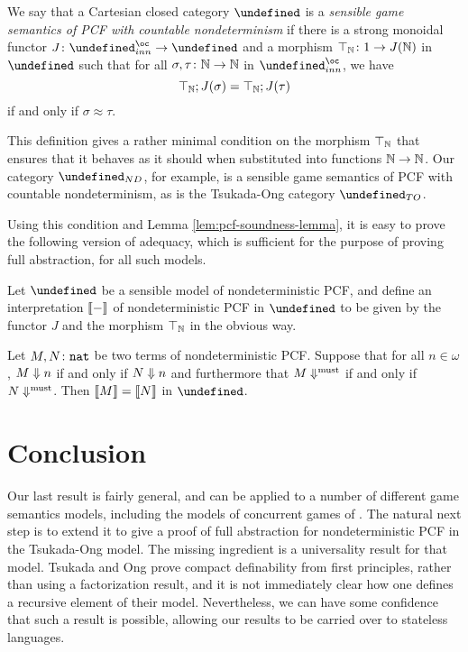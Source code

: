 \documentclass[sigplan,9pt,review]{acmart}\settopmatter{printfolios=true,printccs=false,printacmref=false}
\let\G\undefined
\let\C\undefined
\begin{document}
\begin{definition}
  We say that a Cartesian closed category $\C$ is a \emph{sensible game semantics of PCF with countable nondeterminism} if there is a strong monoidal functor $J\from\G_{inn}^\oc\to\C$ and a morphism $\top_{\mathbb{N}}\colon 1 \to J(\mathbb{N})$ in $\C$ such that for all $\sigma,\tau\colon\mathbb{N}\to\mathbb{N}$ in $\G_{inn}^\oc$, we have
  \[
    \top_{\mathbb{N}};J(\sigma)=\top_{\mathbb{N}};J(\tau)
    \]
  if and only if $\sigma\approx\tau$.  
\end{definition}

This definition gives a rather minimal condition on the morphism $\top_{\mathbb{N}}$ that ensures that it behaves as it should when substituted into functions $\mathbb{N} \to \mathbb{N}$.
Our category $\G_{ND}$, for example, is a sensible game semantics of PCF with countable nondeterminism, as is the Tsukada-Ong category $\G_{TO}$.  

Using this condition and Lemma \ref{lem:pcf-soundness-lemma}, it is easy to prove the following version of adequacy, which is sufficient for the purpose of proving full abstraction, for all such models.

\begin{theorem}
  Let $\C$ be a sensible model of nondeterministic PCF, and define an interpretation $\left\llbracket-\right\rrbracket$ of nondeterministic PCF in $\C$ to be given by the functor $J$ and the morphism $\top_{\mathbb{N}}$ in the obvious way.

  Let $M,N\colon{\mathtt{nat}}$ be two terms of nondeterministic PCF.  
  Suppose that for all $n\in\omega$, $M\Downarrow n$ if and only if $N\Downarrow n$ and furthermore that $M\Downarrow^{\text{must}}$ if and only if $N\Downarrow^{\text{must}}$.  
  Then $\left\llbracket M\right\rrbracket=\left\llbracket N\right\rrbracket$ in $\C$.
\end{theorem}

\section{Conclusion}

\balance
Our last result is fairly general, and can be applied to a number of different game semantics models, including the models of concurrent games of \cite{ConcurrentHylandOngGames}.  
The natural next step is to extend it to give a proof of full abstraction for nondeterministic PCF in the Tsukada-Ong model.  
The missing ingredient is a universality result for that model.  
Tsukada and Ong prove compact definability from first principles, rather than using a factorization result, and it is not immediately clear how one defines a recursive element of their model.  
Nevertheless, we can have some confidence that such a result is possible, allowing our results to be carried over to stateless languages.
\end{document}
